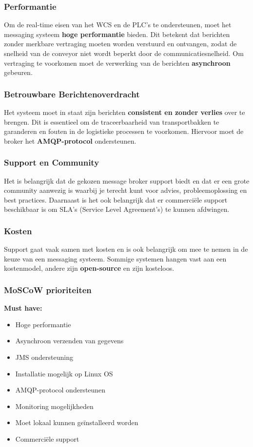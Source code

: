 \subsubsection{Performantie}
Om de real-time eisen van het WCS en de PLC’s te ondersteunen, moet het messaging systeem \textbf{hoge performantie} bieden. 
Dit betekent dat berichten zonder merkbare vertraging moeten worden verstuurd en ontvangen, 
zodat de snelheid van de conveyor niet wordt beperkt door de communicatiesnelheid.
Om vertraging te voorkomen moet de verwerking van de berichten \textbf{asynchroon} gebeuren.

\subsubsection{Betrouwbare Berichtenoverdracht}
Het systeem moet in staat zijn berichten \textbf{consistent en zonder verlies} over te brengen. 
Dit is essentieel om de traceerbaarheid van transportbakken te garanderen en fouten in de logistieke processen te voorkomen.
Hiervoor moet de broker het \textbf{AMQP-protocol} ondersteunen.

\subsubsection{Support en Community}
Het is belangrijk dat de gekozen message broker support biedt en dat er een grote community aanwezig is 
waarbij je terecht kunt voor advies, probleemoplossing en best practices.
Daarnaast is het ook belangrijk dat er commerciële support beschikbaar is om SLA's (Service Level Agreement's) te kunnen afdwingen.

\subsubsection{Kosten}
Support gaat vaak samen met kosten en is ook belangrijk om mee te nemen in de keuze van een messaging systeem.
Sommige systemen hangen vast aan een kostenmodel, andere zijn \textbf{open-source} en zijn kosteloos.
\newpage
\subsubsection{MoSCoW prioriteiten}

\textbf{Must have:}
\begin{itemize}
\item Hoge performantie 
\item Asynchroon verzenden van gegevens  
\item JMS ondersteuning
\item Installatie mogelijk op Linux OS 
\item AMQP-protocol ondersteunen 
\item Monitoring mogelijkheden
\item Moet lokaal kunnen geïnstalleerd worden
\item Commerciële support
\end{itemize}

